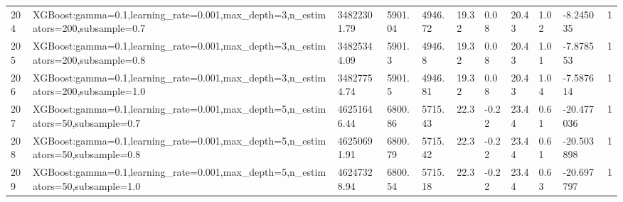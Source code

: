 \begin{longtable}{C{0.8cm} L{2cm} C{1.15cm} C{1.15cm} C{1.15cm} C{1.15cm} C{0.85cm} C{1.25cm} C{1.2cm} C{1.5cm} C{1.0cm}}
204 & XGBoost:\newline gamma=0.1,\newline learning\_rate=0.001,\newline max\_depth=3,\newline n\_estimators=200,\newline subsample=0.7 & 34822301.79 & 5901.04 & 4946.72 & 19.32 & 0.08 & 20.43 & 1.02 & -8.245035 & 1 \\
205 & XGBoost:\newline gamma=0.1,\newline learning\_rate=0.001,\newline max\_depth=3,\newline n\_estimators=200,\newline subsample=0.8 & 34825344.09 & 5901.3 & 4946.8 & 19.32 & 0.08 & 20.43 & 1.01 & -7.878553 & 1 \\
206 & XGBoost:\newline gamma=0.1,\newline learning\_rate=0.001,\newline max\_depth=3,\newline n\_estimators=200,\newline subsample=1.0 & 34827754.74 & 5901.5 & 4946.81 & 19.32 & 0.08 & 20.43 & 1.04 & -7.587614 & 1 \\
207 & XGBoost:\newline gamma=0.1,\newline learning\_rate=0.001,\newline max\_depth=5,\newline n\_estimators=50,\newline subsample=0.7 & 46251646.44 & 6800.86 & 5715.43 & 22.3 & -0.22 & 23.44 & 0.61 & -20.477036 & 1 \\
208 & XGBoost:\newline gamma=0.1,\newline learning\_rate=0.001,\newline max\_depth=5,\newline n\_estimators=50,\newline subsample=0.8 & 46250691.91 & 6800.79 & 5715.42 & 22.3 & -0.22 & 23.44 & 0.61 & -20.503898 & 1 \\
209 & XGBoost:\newline gamma=0.1,\newline learning\_rate=0.001,\newline max\_depth=5,\newline n\_estimators=50,\newline subsample=1.0 & 46247328.94 & 6800.54 & 5715.18 & 22.3 & -0.22 & 23.44 & 0.63 & -20.697797 & 1 \\

\end{longtable}
